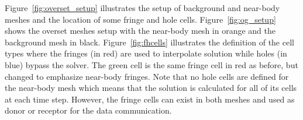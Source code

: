 Figure\ \ref{fig:overset_setup} illustrates the setup of background and near-body meshes and the location of some fringe and hole cells. Figure\ \ref{fig:og_setup} shows the overset meshes setup with the near-body mesh in orange and the background mesh in black. Figure\ \ref{fig:fhcells} illustrates the definition of the cell types where the fringes (in red) are used to interpolate solution while holes (in blue) bypass the solver. The green cell is the same fringe cell in red as before, but changed to emphasize near-body fringes. Note that no hole cells are defined for the near-body mesh which means that the solution is calculated for all of its cells at each time step. However, the fringe cells can exist in both meshes and used as donor or receptor for the data communication.


